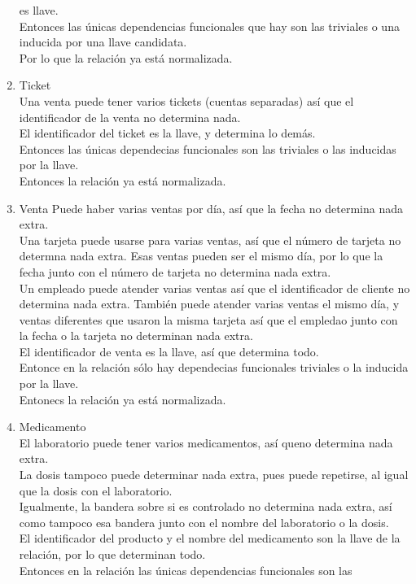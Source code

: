 \documentclass[10pt]{article}
\begin{document}
\begin{enumerate}
	es llave.\\
	Entonces las únicas dependencias funcionales que hay son las triviales o una
	inducida por una llave candidata.\\
	Por lo que la relación ya está normalizada.
	\item Ticket \\
	Una venta puede tener varios tickets (cuentas separadas) así que el
	identificador de la venta no determina nada.\\
	El identificador del ticket es la llave, y determina lo demás.\\
	Entonces las únicas dependecias funcionales son las triviales o las
	inducidas por la llave.\\
	Entonces la relación ya está normalizada.
	\item {Venta}
	Puede haber varias ventas por día, así que la fecha no determina nada extra.\\
	Una tarjeta puede usarse para varias ventas, así que el número de tarjeta no
	determna nada extra. Esas ventas pueden ser el mismo día, por lo que la fecha
	junto con el número de tarjeta no determina nada extra.\\
	Un empleado puede atender varias ventas así que el identificador de cliente
	no determina nada extra. También puede atender varias ventas el mismo día, y
	ventas diferentes que usaron la misma tarjeta así que el empledao junto con
	la fecha o la tarjeta no determinan nada extra.\\
	El identificador de venta es la llave, así que determina todo.\\
	Entonce en la relación sólo hay dependecias funcionales triviales o la
	inducida por la llave.\\
	Entonecs la relación ya está normalizada.
	\item Medicamento \\
	El laboratorio puede tener varios medicamentos, así queno determina nada
	extra. \\
	La dosis tampoco puede determinar nada extra, pues puede repetirse, al igual
	que la dosis con el laboratorio.\\
	Igualmente, la bandera sobre si es controlado no determina nada extra, así
	como tampoco esa bandera junto con el nombre del laboratorio o la dosis.\\
	El identificador del producto y el nombre del medicamento son la llave de la
	relación, por lo que determinan todo.\\
	Entonces en la relación las únicas dependencias funcionales son las

\end{enumerate}
\end{document}
